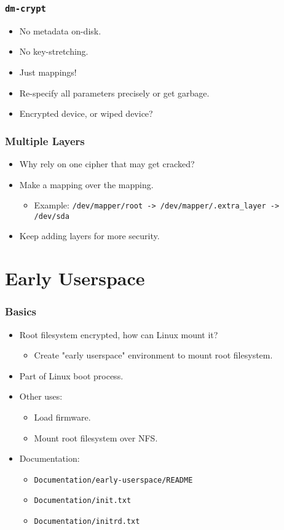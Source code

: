 \documentclass[xcolor={dvipsnames,svgnames},hyperref=dvips]{beamer}
\begin{document}
	\begin{frame}
		\frametitle{\texttt{dm-crypt}}
		\begin{itemize}
		\item No metadata on-disk.
		\item No key-stretching.
		\item Just mappings!
		\item Re-specify all parameters precisely or get garbage.
		\item Encrypted device, or wiped device?
		\end{itemize}
	\end{frame}

	\begin{frame}
		\frametitle{Multiple Layers}
		\begin{itemize}
		\item Why rely on one cipher that may get cracked?
		\item Make a mapping over the mapping.
			\begin{itemize}
			\item Example: \texttt{/dev/mapper/root -> /dev/mapper/.extra\_layer -> /dev/sda}
			\end{itemize}
		\item Keep adding layers for more security.
		\end{itemize}
	\end{frame}

\section{Early Userspace}\label{section:hell}
	\begin{frame}
		\frametitle{Basics}
		\begin{itemize}
		\item Root filesystem encrypted, how can Linux mount it?
			\begin{itemize}
			\item Create "early userspace" environment to mount root filesystem.
			\end{itemize}
		\item Part of Linux boot process.
		\item Other uses:
			\begin{itemize}
			\item Load firmware.
			\item Mount root filesystem over NFS.
			\end{itemize}
		\item Documentation:
			\begin{itemize}
			\item \texttt{Documentation/early-userspace/README}
			\item \texttt{Documentation/init.txt}
			\item \texttt{Documentation/initrd.txt}
			\end{itemize}
		\end{itemize}
	\end{frame}
\end{document}
